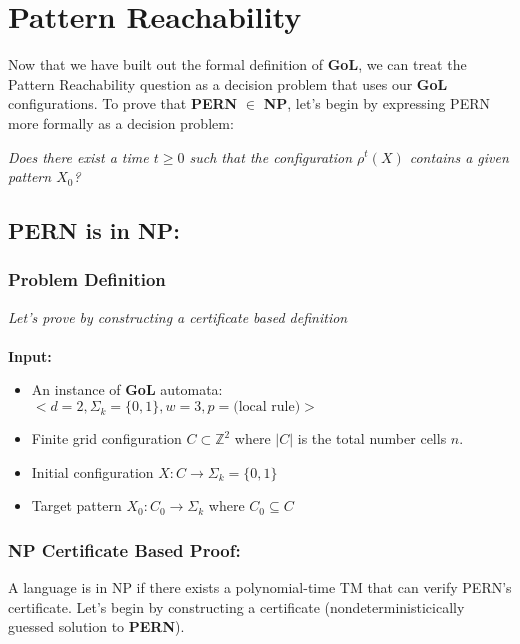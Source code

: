\documentclass{article}
\theoremstyle{definition}
\theoremstyle{plain}
\theoremstyle{plain}
\begin{document}
\section{Pattern Reachability}
Now that we have built out the formal definition of \textbf{GoL}, we can treat the Pattern Reachability question as a decision problem that uses our \textbf{GoL} configurations. To prove that \textbf{PERN} $\in$ \textbf{NP}, let's begin by expressing PERN more formally as a decision problem: 

\textit{Does there exist a time $t \geq 0$ such that the configuration $\rho^t(X)$ contains a given pattern $X_0$?}

\subsection{PERN is in NP:}


\subsubsection*{Problem Definition}
\textit{Let's prove by constructing a certificate based definition}\\
\\
\textbf{Input:}
\begin{itemize}
  \item An instance of \textbf{GoL} automata: $<d = 2, \Sigma_k = \{0,1\}, w = 3, p = \text{(local rule)}>$
    \item Finite grid configuration $ C \subset \mathbb{Z}^2 $ where $ |C| $ is the total number cells $n$.
  \item Initial configuration $ X: C \to \Sigma_k = \{0,1\}$ 
    \item Target pattern $ X_0: C_0 \to \Sigma_k $ where \( C_0 \subseteq C \)
\end{itemize}

\subsubsection{NP Certificate Based Proof:\cite{SUTNER199587}}
A language is in NP if there exists a polynomial-time TM that can verify PERN's certificate. Let's begin by constructing a certificate (nondeterministicically guessed solution to \textbf{PERN}).
\end{document}
